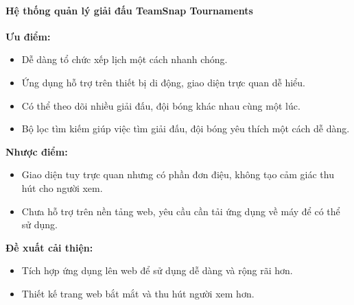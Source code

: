 \paragraph{Hệ thống quản lý giải đấu TeamSnap Tournaments}\mbox{}

\textbf{Ưu điểm:}
\begin{itemize}[itemindent=1cm, label={--}]
  \item Dễ dàng tổ chức xếp lịch một cách nhanh chóng.
  \item Ứng dụng hỗ trợ trên thiết bị di động, giao diện trực quan dễ hiểu.
  \item Có thể theo dõi nhiều giải đấu, đội bóng khác nhau cùng một lúc.
  \item Bộ lọc tìm kiếm giúp việc tìm giải đấu, đội bóng yêu thích một cách dễ dàng.

\end{itemize}

\textbf{Nhược điểm:}
\begin{itemize}[itemindent=1cm, label={--}]
  \item Giao diện tuy trực quan nhưng có phần đơn điệu, không tạo cảm giác thu hút cho người xem.
  \item Chưa hỗ trợ trên nền tảng web, yêu cầu cần tải ứng dụng về máy để có thể sử dụng.
\end{itemize}

\textbf{Đề xuất cải thiện:}
\begin{itemize} [itemindent=1cm, label={--}]
  \item Tích hợp ứng dụng lên web để sử dụng dễ dàng và rộng rãi hơn.
  \item Thiết kế trang web bắt mắt và thu hút người xem hơn.
\end{itemize}
